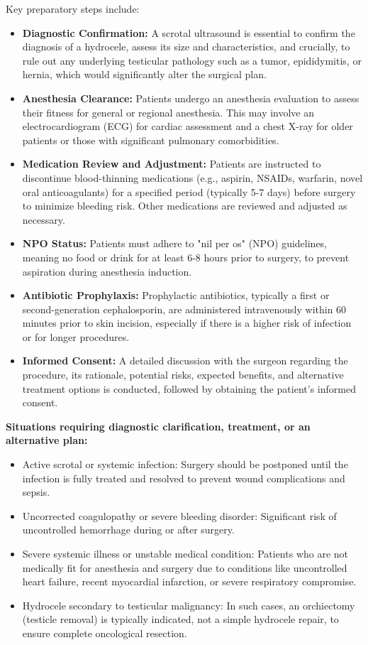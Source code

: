 Key preparatory steps include:
\begin{itemize}
  \item \textbf{Diagnostic Confirmation:} A scrotal ultrasound is essential to confirm the diagnosis of a hydrocele, assess its size and characteristics, and crucially, to rule out any underlying testicular pathology such as a tumor, epididymitis, or hernia, which would significantly alter the surgical plan.
  \item \textbf{Anesthesia Clearance:} Patients undergo an anesthesia evaluation to assess their fitness for general or regional anesthesia. This may involve an electrocardiogram (ECG) for cardiac assessment and a chest X-ray for older patients or those with significant pulmonary comorbidities.
  \item \textbf{Medication Review and Adjustment:} Patients are instructed to discontinue blood-thinning medications (e.g., aspirin, NSAIDs, warfarin, novel oral anticoagulants) for a specified period (typically 5-7 days) before surgery to minimize bleeding risk. Other medications are reviewed and adjusted as necessary.
  \item \textbf{NPO Status:} Patients must adhere to "nil per os" (NPO) guidelines, meaning no food or drink for at least 6-8 hours prior to surgery, to prevent aspiration during anesthesia induction.
  \item \textbf{Antibiotic Prophylaxis:} Prophylactic antibiotics, typically a first or second-generation cephalosporin, are administered intravenously within 60 minutes prior to skin incision, especially if there is a higher risk of infection or for longer procedures.
  \item \textbf{Informed Consent:} A detailed discussion with the surgeon regarding the procedure, its rationale, potential risks, expected benefits, and alternative treatment options is conducted, followed by obtaining the patient's informed consent.
\end{itemize}

\textbf{Situations requiring diagnostic clarification, treatment, or an alternative plan:}
\begin{itemize}
  \item Active scrotal or systemic infection: Surgery should be postponed until the infection is fully treated and resolved to prevent wound complications and sepsis.
  \item Uncorrected coagulopathy or severe bleeding disorder: Significant risk of uncontrolled hemorrhage during or after surgery.
  \item Severe systemic illness or unstable medical condition: Patients who are not medically fit for anesthesia and surgery due to conditions like uncontrolled heart failure, recent myocardial infarction, or severe respiratory compromise.
  \item Hydrocele secondary to testicular malignancy: In such cases, an orchiectomy (testicle removal) is typically indicated, not a simple hydrocele repair, to ensure complete oncological resection.
\end{itemize}

